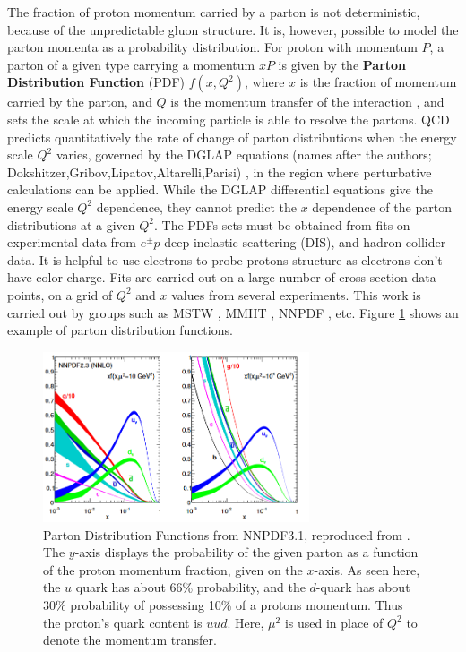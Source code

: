 \documentclass[12pt,a4paper,openright,twoside]{report}
\begin{document}
The fraction of proton momentum carried by a parton is not deterministic, because of the unpredictable gluon structure. It is, however, possible to model the parton momenta as a probability distribution. For proton with momentum $P$, a parton  of a given type carrying a momentum $xP$ is given by the \textbf{Parton Distribution Function} (PDF) $f(x,Q^2)$, where $x$ is the fraction of momentum carried by the parton, and $Q$ is the momentum transfer of the interaction \cite{collider_physics}, and sets the scale at which the incoming particle is able to resolve the partons. QCD predicts quantitatively the rate of change of parton distributions when the energy scale $Q^2$ varies, governed by the DGLAP equations (names after the authors; Dokshitzer,Gribov,Lipatov,Altarelli,Parisi) \cite{DGLAP}, in the region where perturbative calculations can be applied. While the DGLAP differential equations give the energy scale $Q^2$ dependence, they cannot predict the $x$ dependence of the parton distributions at a given $Q^2$. The PDFs sets must be obtained from fits on experimental data from $e^\pm p$ deep inelastic scattering (DIS), and hadron collider data. It is helpful to use electrons to probe protons structure as electrons don't have color charge. Fits are carried out on a large number of cross section data points, on a grid of $Q^2$ and $x$ values from several experiments. This work is carried out by groups such as  MSTW \cite{MSTW, MSTW2, MSTW3}, MMHT \cite{MMHT14}, NNPDF \cite{NNPDF}, etc. Figure \ref{fig:NNPDF3} shows an example of parton distribution functions.

\begin{figure}[h]
\centering
\includegraphics[width=0.7\textwidth]{NNPDF3.png}
\caption{Parton Distribution Functions from NNPDF3.1, reproduced from \cite{NNPDF}. The $y$-axis displays the probability of the given parton as a function of the proton momentum fraction, given on the $x$-axis. As seen here, the $u$ quark has about 66\% probability, and the $d$-quark has about 30\% probability of possessing 10\% of a protons momentum. Thus the proton's quark content is $uud$. Here, $\mu^2$ is used in place of $Q^2$ to denote the momentum transfer.}
\label{fig:NNPDF3}
\end{figure}
\end{document}
